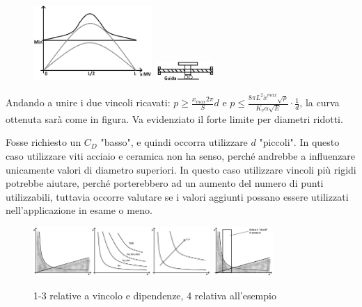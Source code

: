 \begin{figure}[h]
    \centering
    \includegraphics[width=0.4\textwidth]{Immagini/vel_critica_vite_2sol.png}
    \includegraphics[width=0.2\textwidth]{Immagini/vite_guida_MV.png}
\end{figure}

Andando a unire i due vincoli ricavati: \(p \geqslant \frac{\dot{x_{max}} 2\pi }{S} d\) e \( p \leqslant \frac{8\pi L^2 \dot{x}^{max} \sqrt{\rho}}{K_v \alpha \sqrt{E}} \cdot \frac{1}{d} \), la curva ottenuta sarà come in figura. Va evidenziato il forte limite per diametri ridotti.

Fosse richiesto un \( C_D \) "basso", e quindi occorra utilizzare \(d\) "piccoli". In questo caso utilizzare viti acciaio e ceramica non ha senso, perché andrebbe a influenzare unicamente valori di diametro superiori. In questo caso utilizzare vincoli più rigidi potrebbe aiutare, perché porterebbero ad un aumento del numero di punti utilizzabili, tuttavia occorre valutare se i valori aggiunti possano essere utilizzati nell'applicazione in esame o meno.

\begin{figure}[h]
    \centering
    \includegraphics[width=0.6\textwidth]{Immagini/viti_ricir_vincoli_p_d.png}
    \includegraphics[width=0.2\textwidth]{Immagini/viti_ricir_esempio_vincoli.png}
    \caption{1-3 relative a vincolo e dipendenze, 4 relativa all'esempio}
\end{figure}